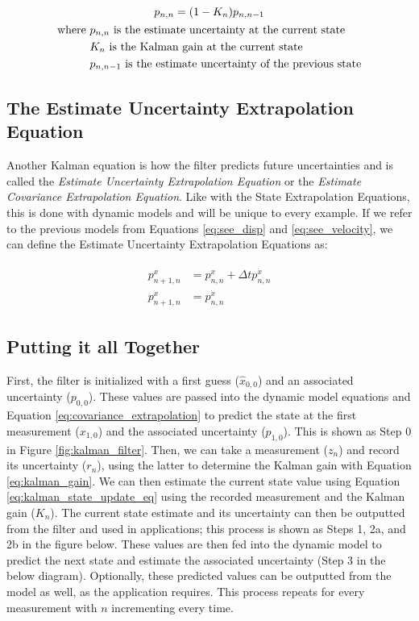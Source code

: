 \begin{gather}
    p_{n,n} = (1-K_n)p_{n,n-1} \\
    \begin{aligned}
        \text{where } &p_{n,n} \text{ is the estimate uncertainty at the current state} \\
                        &K_n \text{ is the Kalman gain at the current state} \\
                        &p_{n,n-1} \text{ is the estimate uncertainty of the previous state}
    \end{aligned} \notag
\end{gather}

\subsection{The Estimate Uncertainty Extrapolation Equation} 
Another Kalman equation is how the filter predicts future uncertainties and is called the \textit{Estimate Uncertainty Extrapolation Equation} or the \textit{Estimate Covariance Extrapolation Equation}.
Like with the State Extrapolation Equations, this is done with dynamic models and will be unique to every example.
If we refer to the previous models from Equations \ref{eq:see_disp} and \ref{eq:see_velocity}, we can define the Estimate Uncertainty Extrapolation Equations as:

\begin{gather}
    \label{eq:covariance_extrapolation}
    \begin{aligned}
        p_{n+1,n}^x &= p_{n,n}^x + \Delta t p_{n,n}^{\dot{x}} \\
        p_{n+1,n}^{\dot{x}} &= p_{n,n}^{\dot{x}}
    \end{aligned}
\end{gather}

\subsection{Putting it all Together}
First, the filter is initialized with a first guess ($\hat{x}_{0,0}$) and an associated uncertainty ($p_{0,0}$).
These values are passed into the dynamic model equations and Equation \ref{eq:covariance_extrapolation} to predict the state at the first measurement ($x_{1,0}$) and the associated uncertainty ($p_{1,0}$).
This is shown as Step 0 in Figure \ref{fig:kalman_filter}.
Then, we can take a measurement ($z_n$) and record its uncertainty ($r_n$), using the latter to determine the Kalman gain with Equation \ref{eq:kalman_gain}.
We can then estimate the current state value using Equation \ref{eq:kalman_state_update_eq} using the recorded measurement and the Kalman gain ($K_n$).
The current state estimate and its uncertainty can then be outputted from the filter and used in applications; this process is shown as Steps 1, 2a, and 2b in the figure below.
These values are then fed into the dynamic model to predict the next state and estimate the associated uncertainty (Step 3 in the below diagram).
Optionally, these predicted values can be outputted from the model as well, as the application requires.
This process repeats for every measurement with $n$ incrementing every time.

